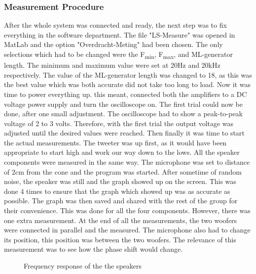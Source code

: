 \documentclass{article}
\begin{document}
\subsubsection{Measurement Procedure}
After the whole system was connected and ready, the next step was to fix everything in the software department. The file "LS-Measure" was opened in MatLab and the option "Overdracht-Meting" had been chosen. The only selections which had to be changed were the F\textsubscript{min}, F\textsubscript{max}, and ML-generator length. The minimum and maximum value were set at 20Hz and 20kHz respectively. The value of the ML-generator length was changed to 18, as this was the best value which was both accurate did not take too long to load.
\newline
Now it was time to power everything up. this meant, connected both the amplifiers to a DC voltage power supply and turn the oscilloscope on. The first trial could now be done, after one small adjustment. The oscilloscope had to show a peak-to-peak voltage of 2 to 3 volts. Therefore, with the first trial the output voltage was adjusted until the desired values were reached. Then finally it was time to start the actual measurements. The tweeter was up first, as it would have been appropriate to start high and work our way down to the lows.
\newline
All the speaker components were measured in the same way. The microphone was set to distance of 2cm from the cone and the program was started. After sometime of random noise, the speaker was still and the graph showed up on the screen. This was done 4 times to ensure that the graph which showed up was as accurate as possible. The graph was then saved and shared with the rest of the group for their convenience. This was done for all the four components. However, there was one extra measurement. At the end of all the measurements, the two woofers were connected in parallel and the measured. The microphone also had to change its position, this position was between the two woofers. The relevance of this measurement was to see how the phase shift would change.


\begin{figure} [H]
\caption{Frequency response of the the speakers}
\label{fig:Calculated_impedance_models_fitted}
\end{figure}
\end{document}
